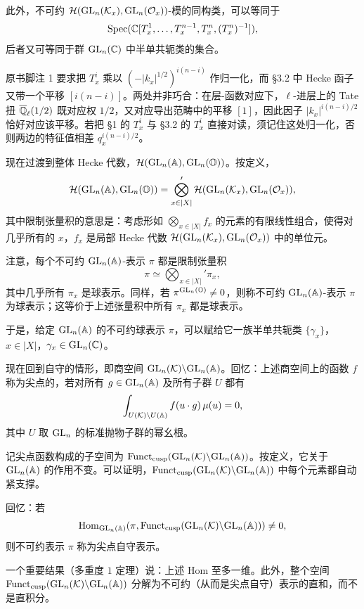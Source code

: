此外，不可约 $\mathcal{H}(\mathrm{GL}_n(\mathcal{K}_x),\mathrm{GL}_n(\mathcal{O}_x))$-模的同构类，可以等同于
\[
\operatorname{Spec}(\mathbb{C}[T_x^1,\dots,T_x^{n-1},T_x^n,(T_x^n)^{-1}]),
\]
后者又可等同于群 $\mathrm{GL}_n(\mathbb{C})$ 中半单共轭类的集合。

\begin{annote}
原书脚注 1 要求把 $T_x^i$ 乘以 $(-|k_x|^{1/2})^{i(n-i)}$ 作归一化，而 \S3.2 中 Hecke 函子又带一个平移 $[i(n-i)]$。两处并非巧合：在层-函数对应下，$\ell$-进层上的 Tate 扭 $\overline{\mathbb{Q}}_\ell(1/2)$ 既对应权 $1/2$，又对应导出范畴中的平移 $[1]$，因此因子 $|k_x|^{i(n-i)/2}$ 恰好对应该平移。若把 \S1 的 $T_x^i$ 与 \S3.2 的 $T_x^i$ 直接对读，须记住这处归一化，否则两边的特征值相差 $q_x^{i(n-i)/2}$。\par\vspace{0.15em}{\raggedleft 【来源：原书脚注 1 与 \S3.2（A）；层-函数对应中的 Tate 扭约定（B）】\par}
\end{annote}

现在过渡到整体 Hecke 代数，$\mathcal{H}(\mathrm{GL}_n(\mathbb{A}),\mathrm{GL}_n(\mathbb{O}))$。按定义，
\[
\mathcal{H}(\mathrm{GL}_n(\mathbb{A}),\mathrm{GL}_n(\mathbb{O}))=\bigotimes_{x\in|X|}'\mathcal{H}(\mathrm{GL}_n(\mathcal{K}_x),\mathrm{GL}_n(\mathcal{O}_x)),
\]
其中限制张量积的意思是：考虑形如 $\bigotimes_{x\in|X|}f_x$ 的元素的有限线性组合，使得对几乎所有的 $x$，$f_x$ 是局部 Hecke 代数 $\mathcal{H}(\mathrm{GL}_n(\mathcal{K}_x),\mathrm{GL}_n(\mathcal{O}_x))$ 中的单位元。

注意，每个不可约 $\mathrm{GL}_n(\mathbb{A})$-表示 $\pi$ 都是限制张量积
\[
\pi\simeq\bigotimes_{x\in|X|}'\pi_x,
\]
其中几乎所有 $\pi_x$ 是球表示。同样，若 $\pi^{\mathrm{GL}_n(\mathbb{O})}\neq0$，则称不可约 $\mathrm{GL}_n(\mathbb{A})$-表示 $\pi$ 为球表示；这等价于上述张量积中所有 $\pi_x$ 都是球表示。

于是，给定 $\mathrm{GL}_n(\mathbb{A})$ 的不可约球表示 $\pi$，可以赋给它一族半单共轭类 $\{\gamma_x\}$，$x\in|X|$，$\gamma_x\in\mathrm{GL}_n(\mathbb{C})$。

现在回到自守的情形，即商空间 $\mathrm{GL}_n(\mathcal{K})\backslash\mathrm{GL}_n(\mathbb{A})$。回忆：上述商空间上的函数 $f$ 称为尖点的，若对所有 $g\in\mathrm{GL}_n(\mathbb{A})$ 及所有子群 $U$ 都有
\[
\int_{U(\mathcal{K})\backslash U(\mathbb{A})}f(u\cdot g)\,\mu(u)=0,
\]
其中 $U$ 取 $\mathrm{GL}_n$ 的标准抛物子群的幂幺根。

记尖点函数构成的子空间为 $\operatorname{Funct}_{\mathrm{cusp}}(\mathrm{GL}_n(\mathcal{K})\backslash\mathrm{GL}_n(\mathbb{A}))$。按定义，它关于 $\mathrm{GL}_n(\mathbb{A})$ 的作用不变。可以证明，$\operatorname{Funct}_{\mathrm{cusp}}(\mathrm{GL}_n(\mathcal{K})\backslash\mathrm{GL}_n(\mathbb{A}))$ 中每个元素都自动紧支撑。

回忆：若
\[
\operatorname{Hom}_{\mathrm{GL}_n(\mathbb{A})}(\pi,\operatorname{Funct}_{\mathrm{cusp}}(\mathrm{GL}_n(\mathcal{K})\backslash\mathrm{GL}_n(\mathbb{A})))\neq0,
\]
则不可约表示 $\pi$ 称为尖点自守表示。

一个重要结果（多重度 $1$ 定理）说：上述 Hom 至多一维。此外，整个空间 $\operatorname{Funct}_{\mathrm{cusp}}(\mathrm{GL}_n(\mathcal{K})\backslash\mathrm{GL}_n(\mathbb{A}))$ 分解为不可约（从而是尖点自守）表示的直和，而不是直积分。

